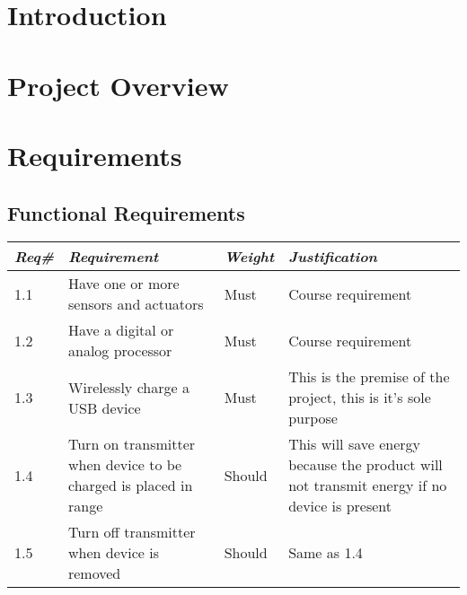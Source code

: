 

\section{Introduction}

\section{Project Overview}

\section{Requirements}

    \subsection{Functional Requirements}
        \begin{centering}
        \begin{tabular}{|l|m{7cm}|l|m{7cm}|} \hline
        \textit{\textbf{Req\#}}	& \textit{\textbf{Requirement}} &\textit{\textbf{Weight}}&\textit{\textbf{Justification}} \\ \hline
        1.1	& Have one or more sensors and actuators & Must	& Course requirement \\ \hline
        1.2	& Have a digital or analog processor & Must	& Course requirement \\ \hline
        1.3	& Wirelessly charge a USB device & Must	& This is the premise of the project, this is it's sole purpose \\ \hline
        1.4	& Turn on transmitter when device to be charged is placed in range	& Should & This will save energy because the product will not transmit energy if no device is present \\ \hline
        1.5 & Turn off transmitter when device is removed	& Should & Same as 1.4 \\ \hline
        \end{tabular}
        \end{centering}
    
